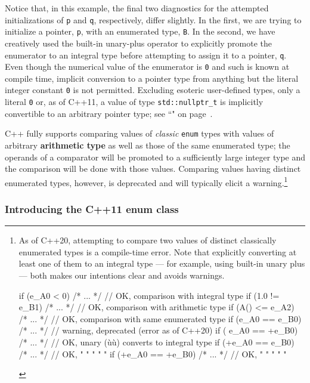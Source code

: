 \noindent Notice that, in this example, the final two diagnostics for the
attempted initializations of \texttt{p} and \texttt{q}, respectively,
differ slightly. In the first, we are trying to initialize a pointer,
\texttt{p}, with an enumerated type, \texttt{B}. In the second, we have
creatively used the built-in unary-plus operator to explicitly promote
the enumerator to an integral type before attempting to assign it to a
pointer, \texttt{q}. Even though the numerical value of the enumerator
is \texttt{0} and such is known at compile time, implicit
conversion to a pointer type from anything but the literal integer
constant \texttt{0} is not
permitted. Excluding esoteric user-defined
types, only a literal \texttt{0} or, as of C++11, a value of type
\texttt{std::nullptr\_t} is implicitly convertible to an arbitrary
  pointer type; see ``" on page~\pageref{null-pointer-literal-(nullptr)}.

C++ fully supports comparing values of \emph{classic} \texttt{enum}
types with values of arbitrary \textbf{arithmetic type} as well as those
of the same enumerated type; the operands of a comparator will be
promoted to a sufficiently large integer type and the comparison will be
done with those values. Comparing values having distinct enumerated
types, however, is deprecated and will typically elicit a
warning.{\cprotect\footnote{As of C++20, attempting to compare two values of distinct classically enumerated
types is a compile-time error. Note that explicitly converting at least one of them to an
integral type --- for example, using built-in unary plus --- both
makes our intentions clear and avoids warnings.

\begin{emcppslisting}[basicstyle={\ttfamily\footnotesize}]
if (e_A0 < 0)       { /* ... */ }  // OK, comparison with integral type
if (1.0 != e_B1)    { /* ... */ }  // OK, comparison with arithmetic type
if (A() <= e_A2)    { /* ... */ }  // OK, comparison with same enumerated type
if (e_A0 == e_B0)   { /* ... */ }  // warning, deprecated (error as of C++20)
if ( e_A0 == +e_B0) { /* ... */ }  // OK, unary (ù{\codeincomments{+}}ù) converts to integral type
if (+e_A0 ==  e_B0) { /* ... */ }  // OK,   "        "     "     "      "
if (+e_A0 == +e_B0) { /* ... */ }  // OK,   "        "     "     "      "
\end{emcppslisting}
      }}

\subsubsection[Introducing the C++11 {\tt enum class}]{Introducing the C++11 {\SubsubsecCode enum class}}\label{introducing-the-c++11-enum-class}

